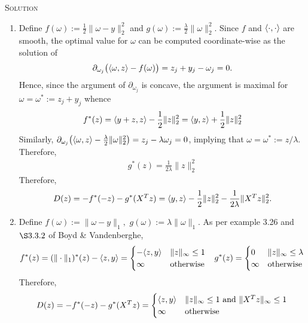\documentclass{article}
\begin{document}
\textsc{Solution}

\begin{enumerate}
\item Define $f(\omega) := \frac{1}{2} \|\omega -y \|_2^2$ and $g(\omega) :=
  \frac{\lambda}{2}\|\omega\|_2^2$. Since $f$ and $\langle \cdot,\cdot\rangle$ are
  smooth, the optimal value for $\omega$ can be computed coordinate-wise as the
  solution of 
  \begin{align*}
    \partial_{\omega_j} \big(\langle \omega, z\rangle - f(\omega)\big) = z_j + y_j -
    \omega_j = 0. 
  \end{align*}
  Hence, since the argument of $\partial_{\omega_j}$ is concave, the argument
  is maximal for $\omega = \omega^* := z_j + y_j$ whence
  \begin{align*}
    f^*(z) = \langle y+z,z\rangle - \frac{1}{2} \|z\|_2^2 = \langle y,z\rangle + \frac{1}{2} \|z\|_2^2
  \end{align*}
  Similarly,
  $\partial_{\omega_j} \big( \langle \omega,z\rangle - \frac{\lambda}{2} \|\omega\|_2^2
  \big) = z_j - \lambda \omega_j = 0$, implying that
  $\omega = \omega^* := z/\lambda$. Therefore,
  \begin{align*}
    g^*(z) = \frac{1}{2\lambda} \|z\|_2^2
  \end{align*}
  Therefore,
  \begin{align*}
    D(z) = -f^* (-z) - g^*(X^Tz) = \langle y,z\rangle - \frac{1}{2} \|z\|_2^2 -
    \frac{1}{2\lambda} \|X^T z\|_2^2.
  \end{align*}
\item Define $f(\omega) := \|\omega - y\|_1,\,\, g(\omega) :=
  \lambda\|\omega\|_1$. As per example 3.26 and $\S 3.3.2$ of Boyd \& Vandenberghe,
  \begin{align*}
    f^*(z) &= (\|\cdot\|_1)^*(z) - \langle z,y\rangle =
    \begin{cases}
      -\langle z,y\rangle & \|z\|_\infty \leq 1\\
      \infty & \text{otherwise}
    \end{cases}
                &
                  g^*(z) &=
                           \begin{cases}
                             0 & \|z\|_\infty \leq \lambda\\
                             \infty & \text{otherwise}
                           \end{cases}
  \end{align*}
  Therefore,
  \begin{align*}
    D(z) = - f^*(-z) - g^*(X^T z) =
    \begin{cases}
      \langle z,y\rangle & \|z\|_\infty \leq 1\text{ and } \|X^T
      z\|_\infty \leq 1\\
      \infty & \text{otherwise}
    \end{cases}
  \end{align*}


\end{enumerate}
\end{document}
